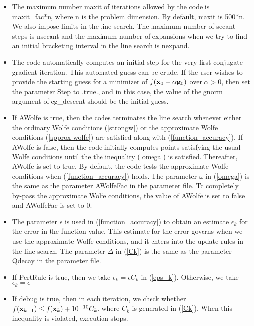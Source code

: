 \documentclass [12pt] {article}
\newcommand{\m}[1]{{\bf{#1}}}
\begin{document}
\begin{itemize}
\item
The maximum number {\sc maxit} of iterations allowed by the code is
{\sc maxit\_fac}*{\sc n}, where {\sc n} is the problem dimension.
By default, {\sc maxit} is 500*{\sc n}.
We also impose limits in the line search.
The maximum number of secant steps is {\sc nsecant} and the maximum
number of expansions when we try to find an initial bracketing
interval in the line search is {\sc nexpand}.
\item
The code automatically computes an initial step for the
very first conjugate gradient iteration.
This automated guess can be crude.
If the user wishes to provide the starting guess for a minimizer of
$f(\m{x}_0 - \alpha \m{g}_0)$ over $\alpha > 0$, then set the parameter
{\sc Step} to .true., and in this case,
the value of the {\sc gnorm} argument of {\sc cg\_descent}
should be the initial guess.
\item
If {\sc AWolfe} is true, then the codes terminates the line search
whenever either the ordinary Wolfe conditions (\ref{strongw})
or the approximate Wolfe conditions (\ref{approx-wolfe}) are
satisfied along with (\ref{function_accuracy}).
If {\sc AWolfe} is false, then the code 
initially computes points satisfying the usual Wolfe conditions
until the the inequality (\ref{omega}) is satisfied.
Thereafter, {\sc AWolfe} is set to true.
By default, the code tests the approximate Wolfe conditions when
(\ref{function_accuracy}) holds.
The parameter $\omega$ in (\ref{omega}) is the same
as the parameter {\sc AWolfeFac} in the parameter file.
To completely by-pass the approximate Wolfe conditions,
the value of {\sc AWolfe}
is set to false and {\sc AWolfeFac} is set to 0.
\item
The parameter $\epsilon$ is used in (\ref{function_accuracy})
to obtain an estimate $\epsilon_k$ for the error in the function value.
This estimate for the error governs when we use the
approximate Wolfe conditions, and it enters into the update rules in 
the line search.
The parameter $\Delta$ in (\ref{Ck}) is the same as the
parameter {\sc Qdecay} in the parameter file.
\item
If {\sc PertRule} is true, then we take $\epsilon_k = \epsilon C_k$
in (\ref{eps_k}).
Otherwise, we take $\epsilon_k = \epsilon$
\item
If {\sc debug} is true, then in each iteration, we check whether
$f(\m{x}_{k+1}) \le f (\m{x}_k) + 10^{-10} C_k$, where $C_k$ is
generated in (\ref{Ck}).
When this inequality is violated, execution stops.

\end{itemize}
\end{document}
